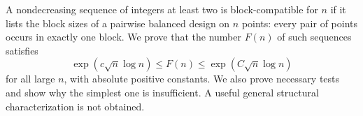 A nondecreasing sequence of integers at least two is block-compatible for $n$ if it lists the block sizes of a pairwise balanced design on $n$ points: every pair of points occurs in exactly one block. We prove that the number $F(n)$ of such sequences satisfies
\[
 \exp(c\sqrt n\log n)\leq F(n)\leq\exp(C\sqrt n\log n)
\]
for all large $n$, with absolute positive constants. We also prove necessary tests and show why the simplest one is insufficient. A useful general structural characterization is not obtained.
